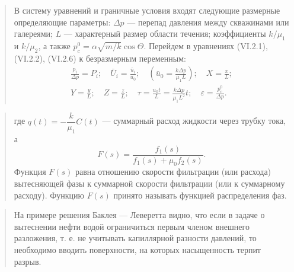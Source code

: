 \documentclass[12pt,a4paper]{article}
\begin{document}
\begin{quote}\sloppy
В систему уравнений и граничные условия входят следующие размерные определяющие параметры: $\Delta p$ --- перепад давления между скважинами или галереями; $L$ --- характерный размер области течения; коэффициенты $k/\mu_1$ и $k/\mu_2$, а также $p_c^0=\alpha\sqrt{m/k}\cos\Theta$. Перейдем в уравнениях (VI.2.1), (VI.2.2), (VI.2.6) к безразмерным переменным:
\[\begin{gathered}
\frac{p_i}{\Delta p}=P_i;\quad\bar U_i=\frac{\bar u_i}{u_0};\quad\left(\bar u_0=\frac{k\Delta p}{\mu_1L}\right);\quad X=\frac{x}{L};\\
Y=\frac{y}{L};\quad Z=\frac{z}{L};\quad\tau=\frac{u_0t}{L}=\frac{k\Delta p}{\mu_1L^2}t;\quad\varepsilon=\frac{p_c^0}{\Delta p}.
\end{gathered}\]

\par\nobreak{}\par
\end{quote}

\begin{quote}\sloppy
где $q(t)=-\dfrac{k}{\mu_1}C(t)$ --- суммарный расход жидкости через трубку тока, а
\[F(s)=\frac{f_1(s)}{f_1(s)+\mu_0f_2(s)}.\]
Функция $F(s)$ равна отношению скорости фильтрации (или расхода) вытесняющей фазы к суммарной скорости фильтрации (или к суммарному расходу). Функцию $F(s)$ принято называть функцией распределения фаз.
\par\nobreak{}\par
\end{quote}

\begin{quote}\sloppy
На примере решения Баклея --- Леверетта видно, что если в задаче о вытеснении нефти водой ограничиться первым членом внешнего разложения, т. е. не учитывать капиллярной разности давлений, то необходимо вводить поверхности, на которых насыщенность терпит разрыв.


\par\nobreak{}\par
\end{quote}
\end{document}
